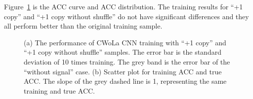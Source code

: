 \documentclass[12pt]{article}
\begin{document}
        Figure~\ref{fig:cwola_cnn_training_performance_copy_1_wo_shuffle} is the ACC curve and ACC distribution. The training results for ``+1 copy'' and ``+1 copy without shuffle'' do not have significant differences and they all perform better than the original training sample.
        \begin{figure}[htpb]
            \centering
            \caption{(a) The performance of CWoLa CNN training with ``+1 copy'' and ``+1 copy without shuffle'' samples. The error bar is the standard deviation of 10 times training. The grey band is the error bar of the ``without signal'' case. (b) Scatter plot for training ACC and true ACC. The slope of the grey dashed line is 1, representing the same training and true ACC.}
            \label{fig:cwola_cnn_training_performance_copy_1_wo_shuffle}
        \end{figure}
\end{document}
